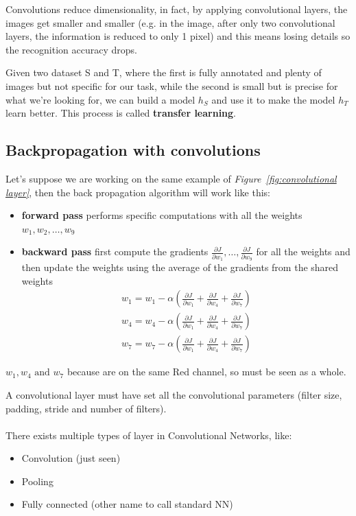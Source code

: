 \documentclass[oneside]{academica}
\begin{document}
Convolutions reduce dimensionality, in fact, by applying convolutional layers, the images get smaller and smaller (e.g. in the image, after only two convolutional layers, the information is reduced to only 1 pixel) and this means losing details so the recognition accuracy drops. 

Given two dataset S and T, where the first is fully annotated and plenty of images but not specific for our task, while the second is small but is precise for what we're looking for, we can build a model $h_S$ and use it to make the model $h_T$ learn better. This process is called \textbf{transfer learning}.

\subsection{Backpropagation with convolutions}

Let's suppose we are working on the same example of \textit{Figure~\ref{fig:convolutional layer}}, then the back propagation algorithm will work like this:
\begin{itemize}[label=]
  \item \textbf{forward pass} performs specific computations with all the weights $w_1, w_2, \dots, w_9$
  \item \textbf{backward pass} first compute the gradients $\frac{\partial J}{\partial w_1} , \dots , \frac{\partial J}{\partial w_9}$ for all the weights and then update the weights using the average of the gradients from the shared weights
    \begin{gather*}
      w_1 = w_1 - \alpha \left(\frac{\partial J}{\partial w_1} + \frac{\partial J}{\partial w_4} + \frac{\partial J}{\partial w_7} \right) \\
      w_4 = w_4 - \alpha \left(\frac{\partial J}{\partial w_1} + \frac{\partial J}{\partial w_4} + \frac{\partial J}{\partial w_7} \right) \\
      w_7 = w_7 - \alpha \left(\frac{\partial J}{\partial w_1} + \frac{\partial J}{\partial w_4} + \frac{\partial J}{\partial w_7} \right)
    \end{gather*}
\end{itemize}

\begin{note}
  $w_1, w_4 \text{ and } w_7$ because are on the same Red channel, so must be seen as a whole.
\end{note}

\newpage

A convolutional layer must have set all the convolutional parameters (filter size, padding, stride and number of filters).
\\\\
There exists multiple types of layer in Convolutional Networks, like:
\begin{itemize}
  \item Convolution (just seen)
  \item Pooling
  \item Fully connected (other name to call standard NN)
\end{itemize}
\end{document}
